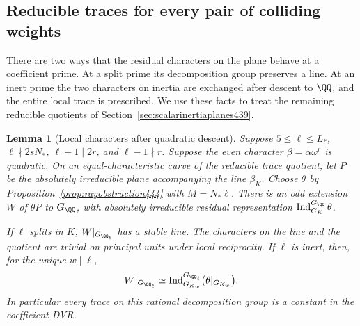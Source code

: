 \documentclass[a4paper,11pt]{article}
\newtheorem{lemma}[proposition]{Lemma}
\theoremstyle{definition}
\theoremstyle{remark}
\numberwithin{equation}{section}
\begin{document}
\subsection{Reducible traces for every pair of colliding weights}
\label{sec:allcollisiontraces445}

There are two ways that the residual characters on the plane
behave at a coefficient prime. At a split prime its decomposition
group preserves a line. At an inert prime the two characters on
inertia are exchanged after descent to \(\QQ\), and the entire
local trace is prescribed. We use these facts to treat the
remaining reducible quotients of Section~\ref{sec:scalarinertiaplanes439}.

\begin{lemma}[Local characters after quadratic descent]\leavevmode
\label{lem:quadraticdecomposition445}
Suppose \(5\le\ell\le L_*\), \(\ell\nmid 2sN_*\),
\(\ell-1\mid2r\), and \(\ell-1\nmid r\). Suppose the even
character \(\beta=\bar\alpha\omega^r\) is quadratic. On an
equal-characteristic curve of the reducible trace quotient, let
\(P\) be the absolutely irreducible plane accompanying the line
\(\beta_K\). Choose \(\theta\) by
Proposition~\ref{prop:rayobstruction444} with \(M=N_*\ell\).
There is an odd extension \(W\) of \(\theta P\) to \(G_\QQ\),
with absolutely irreducible residual representation
\(\operatorname{Ind}_{G_K}^{G_\QQ}\theta\).

If \(\ell\) splits in \(K\), \(W|_{G_{\QQ_\ell}}\) has a stable
line. The characters on the line and the quotient are trivial
on principal units under local reciprocity. If \(\ell\) is
inert, then, for the unique \(w\mid\ell\),
\[
      W|_{G_{\QQ_\ell}}\simeq
          \operatorname{Ind}_{G_{K_w}}^{G_{\QQ_\ell}}
                  \bigl(\theta|_{G_{K_w}}\bigr).
\]
In particular every trace on this rational decomposition group
is a constant in the coefficient DVR.
\end{lemma}
\end{document}
